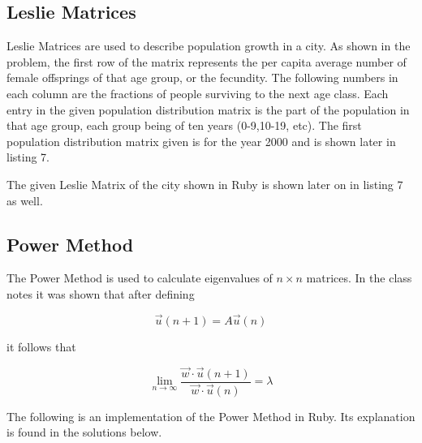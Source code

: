 \documentclass[letterpaper,12pt]{article}
\begin{document}
\subsection{Leslie Matrices}

Leslie Matrices are used to describe population growth in a city.
As shown in the problem, the first row of the matrix represents the per capita
average number of female offsprings of that age group, or the fecundity.
The following numbers in each column are the fractions of people surviving to the
next age class.
Each entry in the given population distribution matrix is the part of the
population in that age group, each group being of ten years (0-9,10-19, etc).
The first population distribution matrix given is for the year 2000 and is shown
later in listing 7.

The given Leslie Matrix of the city shown in Ruby is shown later on in listing 7 as well.

\subsection{Power Method}

The Power Method is used to calculate eigenvalues of $n \times n$ matrices.
In the class notes it was shown that after defining 

\[\vec{u}(n+1) = A\vec{u}(n)\]

it follows that

\[\lim_{n\to\infty} \frac{{\vec{w}} \cdot {\vec{u}(n+1)}}{ {\vec{w}} \cdot {\vec{u}(n)}} =\lambda\]

The following is an implementation of the Power Method in Ruby.
Its explanation is found in the solutions below.
\end{document}
